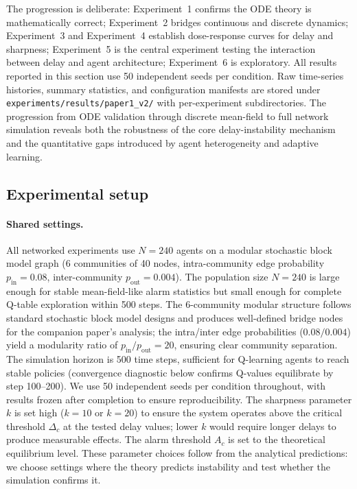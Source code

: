 The progression is deliberate: Experiment~1 confirms the ODE theory is mathematically correct; Experiment~2 bridges continuous and discrete dynamics; Experiment~3 and Experiment~4 establish dose-response curves for delay and sharpness; Experiment~5 is the central experiment testing the interaction between delay and agent architecture; Experiment~6 is exploratory. All results reported in this section use 50 independent seeds per condition. Raw time-series histories, summary statistics, and configuration manifests are stored under \texttt{experiments/results/paper1\_v2/} with per-experiment subdirectories. The progression from ODE validation through discrete mean-field to full network simulation reveals both the robustness of the core delay-instability mechanism and the quantitative gaps introduced by agent heterogeneity and adaptive learning.

\subsection{Experimental setup}

\paragraph{Shared settings.} All networked experiments use $N=240$ agents on a modular stochastic block model graph (6 communities of 40 nodes, intra-community edge probability $p_{\mathrm{in}}=0.08$, inter-community $p_{\mathrm{out}}=0.004$). The population size $N{=}240$ is large enough for stable mean-field-like alarm statistics but small enough for complete Q-table exploration within 500 steps. The 6-community modular structure follows standard stochastic block model designs \citep{holland1983stochastic} and produces well-defined bridge nodes for the companion paper's analysis; the intra/inter edge probabilities ($0.08/0.004$) yield a modularity ratio of $p_{\mathrm{in}}/p_{\mathrm{out}}=20$, ensuring clear community separation. The simulation horizon is 500 time steps, sufficient for Q-learning agents to reach stable policies (convergence diagnostic below confirms Q-values equilibrate by step 100--200). We use 50 independent seeds per condition throughout, with results frozen after completion to ensure reproducibility. The sharpness parameter $k$ is set high ($k=10$ or $k=20$) to ensure the system operates above the critical threshold $\Delta_c$ at the tested delay values; lower $k$ would require longer delays to produce measurable effects. The alarm threshold $A_c$ is set to the theoretical equilibrium level. These parameter choices follow from the analytical predictions: we choose settings where the theory predicts instability and test whether the simulation confirms it.

